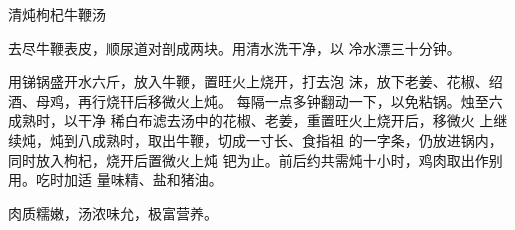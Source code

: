 \begin{recipe}{清炖枸杞牛鞭汤}

\ingredients




\cooking

去尽牛鞭表皮，顺尿道对剖成两块。用清水洗干净，以 冷水漂三十分钟。

用锑锅盛开水六斤，放入牛鞭，置旺火上烧开，打去泡 沫，放下老姜、花椒、绍酒、母鸡，再行烧幵后移微火上炖。 每隔一点多钟翻动一下，以免粘锅。烛至六成熟时，以干净 稀白布滤去汤中的花椒、老姜，重置旺火上烧开后，移微火 上继续炖，炖到八成熟时，取出牛鞭，切成一寸长、食指祖 的一字条，仍放进锅内，同时放入枸杞，烧开后置微火上炖 钯为止。前后约共需炖十小时，鸡肉取出作别用。吃时加适 量味精、盐和猪油。

\notes

肉质糯嫩，汤浓味允，极富营养。

\end{recipe}

